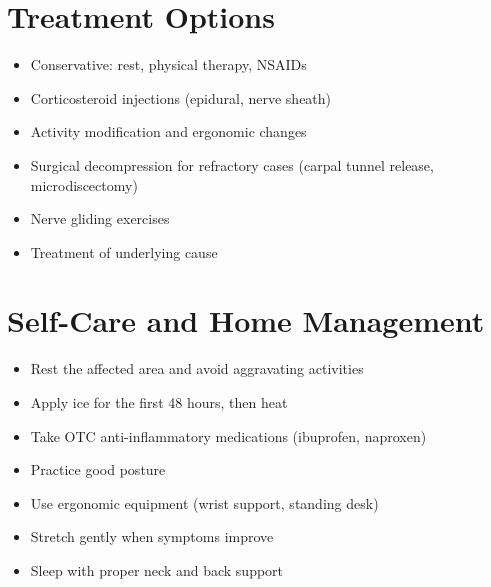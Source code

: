 \section*{Treatment Options}
\begin{itemize}
\item Conservative: rest, physical therapy, NSAIDs
\item Corticosteroid injections (epidural, nerve sheath)
\item Activity modification and ergonomic changes
\item Surgical decompression for refractory cases (carpal tunnel release, microdiscectomy)
\item Nerve gliding exercises
\item Treatment of underlying cause
\end{itemize}

\section*{Self-Care and Home Management}
\begin{itemize}
\item Rest the affected area and avoid aggravating activities
\item Apply ice for the first 48 hours, then heat
\item Take OTC anti-inflammatory medications (ibuprofen, naproxen)
\item Practice good posture
\item Use ergonomic equipment (wrist support, standing desk)
\item Stretch gently when symptoms improve
\item Sleep with proper neck and back support
\end{itemize}

